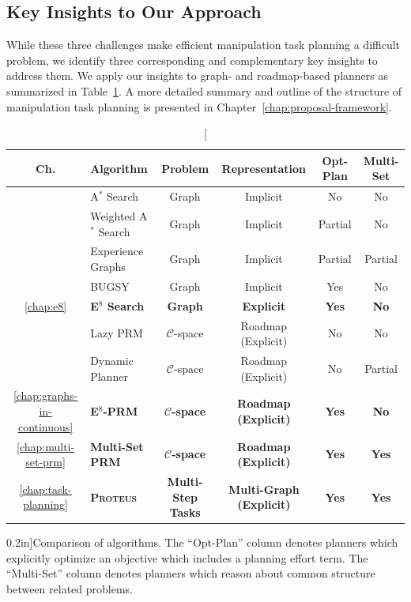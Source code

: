 \subsection*{Key Insights to Our Approach}

While these three challenges make efficient
manipulation task planning a difficult problem,
we identify three corresponding and complementary
key insights to address them.
We apply our insights to graph- and roadmap-based planners
as summarized in Table~\ref{table:intro-algorithms}.
A more detailed summary and outline of the structure of
manipulation task planning is presented in
Chapter~\ref{chap:proposal-framework}.

\begin{table}[t]
   \centering
   {\renewcommand{\arraystretch}{1.1}
   \begin{tabular}{clcccc}
   \toprule
   {\bf Ch.} & Algorithm & Problem & Representation & Opt-Plan & Multi-Set \\
   \midrule
   & A$^*$ Search \citep{hart1968astar} & Graph & Implicit & No & No \\
   & Weighted A$^*$ Search & Graph & Implicit & Partial & No \\
   & Experience Graphs \citep{phillips2012egraphs} & Graph & Implicit & Partial & Partial \\
   & BUGSY \citep{ruml2007bugsy} & Graph & Implicit & Yes & No \\
    \ref{chap:e8}
      & {\bf E$^8$ Search}
      & {\bf Graph} & {\bf Explicit} & {\bf Yes} & {\bf No} \\
   \midrule
   & Lazy PRM \citep{bohlin2000lazyprm} & $\mathcal{C}$-space & Roadmap (Explicit) & No & No \\
   & Dynamic Planner \citep{jaillet2004dynamicprm} & $\mathcal{C}$-space & Roadmap (Explicit) & No & Partial \\
   \ref{chap:graphs-in-continuous}
      & {\bf E$^8$-PRM}
      & {\bf $\mathcal{C}$-space} & {\bf Roadmap (Explicit)} & {\bf Yes} & {\bf No} \\
   \ref{chap:multi-set-prm}
      & {\bf Multi-Set PRM}
      & {\bf $\mathcal{C}$-space} & {\bf Roadmap (Explicit)} & {\bf Yes} & {\bf Yes} \\
   \midrule
   \ref{chap:task-planning}
      & {\bf \textsc{Proteus}}
      & {\bf Multi-Step Tasks} & {\bf Multi-Graph (Explicit)} & {\bf Yes} & {\bf Yes} \\
   \bottomrule
   \end{tabular}
   } %
   \caption[][0.2in]{Comparison of algorithms.
      The ``Opt-Plan'' column denotes planners which explicitly
      optimize an objective which includes a planning effort term.
      The ``Multi-Set'' column denotes planners which reason about
      common structure between related problems.}
   \label{table:intro-algorithms}
\end{table}

